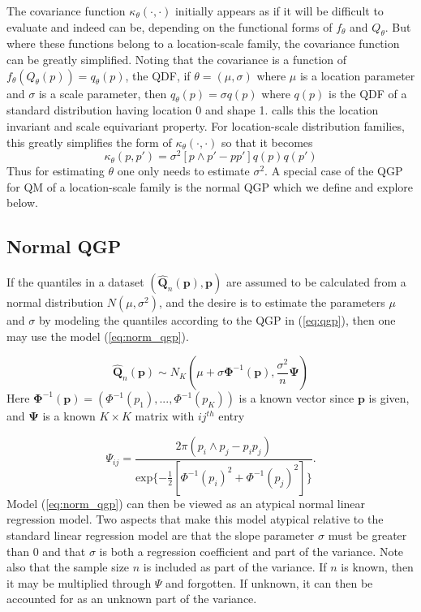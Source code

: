 \documentclass[preprint,12pt,authoryear]{elsarticle}
\newcommand{\1}[1]{\mathds{1}\left[#1\right]}
\begin{document}
The covariance function $\kappa_{\theta} (\cdot, \cdot)$ initially appears as 
if it will be difficult to evaluate and indeed can be, depending on the 
functional forms of $f_{\theta}$ and $Q_{\theta}$. But where these functions 
belong to a location-scale family, the covariance function can be greatly 
simplified. 
Noting that the covariance is a function of $f_{\theta}(Q_{\theta}(p)) = q_{\theta}(p)$, the QDF, if $\theta = (\mu, \sigma)$ where $\mu$ is a location parameter and $\sigma$ is a scale parameter, then $q_{\theta}(p) = \sigma q(p)$ where $q(p)$ is the QDF of a standard distribution having location 0 and shape 1. \cite{staudte2017shapes} calls this the location invariant and scale equivariant property. For location-scale distribution families, this greatly simplifies the form of $\kappa_{\theta}(\cdot,\cdot)$ so that it becomes
\[
    \kappa_{\theta}(p, p') = \sigma^{2}[p\wedge p' - p p'] q(p)q(p') 
\] 
Thus for estimating $\theta$ one only needs to estimate $\sigma^2$. A special 
case of the QGP for QM of a location-scale family is the normal QGP which we 
define and explore below.


\subsection{Normal QGP}

If the quantiles in a dataset 
$(\hat{\boldsymbol{Q}}_n(\boldsymbol{p}),\boldsymbol{p})$ are assumed to be 
calculated from a normal distribution $N(\mu, \sigma^2)$, and the desire is to 
estimate the parameters $\mu$ and $\sigma$ by modeling the quantiles according 
to the QGP in (\ref{eq:qgp}), then one may use the model (\ref{eq:norm_qgp}). 

\begin{equation}
    \label{eq:norm_qgp}
\hat{\boldsymbol{Q}}_n(\boldsymbol{p}) \sim N_K 
\left( \mu + \sigma \boldsymbol{\Phi}^{-1}(\boldsymbol{p}),\frac{\sigma^2}{n} 
\boldsymbol{\Psi} \right)
\end{equation}
Here $\boldsymbol{\Phi}^{-1}(\boldsymbol{p}) = (\Phi^{-1}(p_1), ..., 
\Phi^{-1}(p_K))$ is a known vector since $\boldsymbol{p}$ is given, and 
$\boldsymbol{\Psi}$ is a known $K\times K$ matrix with $ij^{th}$ entry

\[
    \Psi_{ij} = \frac{2 \pi (p_i\wedge p_j - p_i p_j)}{\text{exp}\{-\frac{1}{2}[\Phi^{-1}(p_i)^2 + \Phi^{-1}(p_j)^2]\}}.
\]
Model (\ref{eq:norm_qgp}) can then be viewed as an atypical normal linear 
regression model. Two aspects that make this model atypical relative to the 
standard linear regression model are that the slope parameter $\sigma$ must be 
greater than 0 and that $\sigma$ is both a regression coefficient and part of 
the variance.
Note also that the sample size $n$ is included as part of the variance. If $n$ 
is known, then it may be multiplied through $\Psi$ and forgotten. If unknown, 
it can then be accounted for as an unknown part of the variance. 
\end{document}
